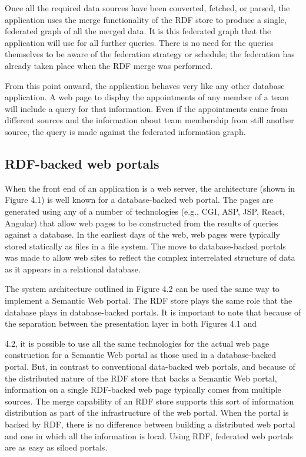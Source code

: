 Once all the required data sources have been converted, fetched, or
parsed, the application uses the merge functionality of the RDF store to
produce a single, federated graph of all the merged data. It is this
federated graph that the application will use for all further queries.
There is no need for the queries themselves to be aware of the
federation strategy or schedule; the federation has already taken place
when the RDF merge was performed.

From this point onward, the application behaves very like any other
database application. A web page to display the appointments of any
member of a team will include a query for that information. Even if the
appointments came from different sources and the information about team
membership from still another source, the query is made against the
federated information graph.

\subsection{RDF-backed web portals}

When the front end of an application is a web server, the architecture
(shown in Figure 4.1) is well known for a database-backed web portal.
The pages are generated using any of a number of technologies (e.g.,
CGI, ASP, JSP, React, Angular) that allow web pages to be constructed
from the results of queries against a database. In the earliest days of
the web, web pages were typically stored statically as files in a file
system. The move to database-backed portals was made to allow web sites
to reflect the complex interrelated structure of data as it appears in a
relational database.

The system architecture outlined in Figure 4.2 can be used the same way
to implement a Semantic Web portal. The RDF store plays the same role
that the database plays in database-backed portals. It is important to
note that because of the separation between the presentation layer in
both Figures 4.1 and

4.2, it is possible to use all the same technologies for the actual web
page construction for a Semantic Web portal as those used in a
database-backed portal. But, in contrast to conventional data-backed web
portals, and because of the distributed nature of the RDF store that
backs a Semantic Web portal, information on a single RDF-backed web page
typically comes from multiple sources. The merge capability of an RDF
store supports this sort of information distribution as part of the
infrastructure of the web portal. When the portal is backed by RDF,
there is no difference between building a distributed web portal and one
in which all the information is local. Using RDF, federated web portals
are as easy as siloed portals.

